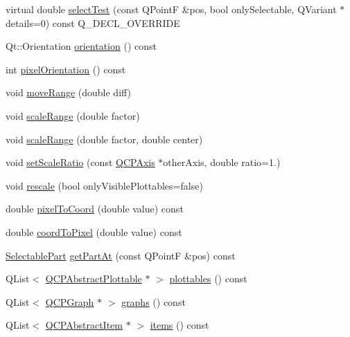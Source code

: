 \begin{DoxyCompactItemize}
\item 
virtual double \hyperlink{classQCPAxis_a63b7103c57fe9acfbce164334ea837f8}{select\+Test} (const Q\+PointF \&pos, bool only\+Selectable, Q\+Variant $\ast$details=0) const Q\+\_\+\+D\+E\+C\+L\+\_\+\+O\+V\+E\+R\+R\+I\+DE
\item 
Qt\+::\+Orientation \hyperlink{classQCPAxis_a57483f2f60145ddc9e63f3af53959265}{orientation} () const 
\item 
int \hyperlink{classQCPAxis_ae3b000e10a6885b8ee05298ae7124ab6}{pixel\+Orientation} () const 
\item 
void \hyperlink{classQCPAxis_a18f3a68f2b691af1fd34b6593c886630}{move\+Range} (double diff)
\item 
void \hyperlink{classQCPAxis_a31d18ddf3a4f21ceb077db8ae5b69856}{scale\+Range} (double factor)
\item 
void \hyperlink{classQCPAxis_a7072ff96fe690148f1bbcdb4f773ea1c}{scale\+Range} (double factor, double center)
\item 
void \hyperlink{classQCPAxis_af4bbd446dcaee5a83ac30ce9bcd6e125}{set\+Scale\+Ratio} (const \hyperlink{classQCPAxis}{Q\+C\+P\+Axis} $\ast$other\+Axis, double ratio=1.)
\item 
void \hyperlink{classQCPAxis_a499345f02ebce4b23d8ccec96e58daa9}{rescale} (bool only\+Visible\+Plottables=false)
\item 
double \hyperlink{classQCPAxis_ae9289ef7043b9d966af88eaa95b037d1}{pixel\+To\+Coord} (double value) const 
\item 
double \hyperlink{classQCPAxis_a985ae693b842fb0422b4390fe36d299a}{coord\+To\+Pixel} (double value) const 
\item 
\hyperlink{classQCPAxis_abee4c7a54c468b1385dfce2c898b115f}{Selectable\+Part} \hyperlink{classQCPAxis_ab2965a8ab1da948b897f1c006080760b}{get\+Part\+At} (const Q\+PointF \&pos) const 
\item 
Q\+List$<$ \hyperlink{classQCPAbstractPlottable}{Q\+C\+P\+Abstract\+Plottable} $\ast$ $>$ \hyperlink{classQCPAxis_a4f7404494cccdbfc00e1e865b7ed16a4}{plottables} () const 
\item 
Q\+List$<$ \hyperlink{classQCPGraph}{Q\+C\+P\+Graph} $\ast$ $>$ \hyperlink{classQCPAxis_ad3919e7d7400f55446ea82018fe5e3a8}{graphs} () const 
\item 
Q\+List$<$ \hyperlink{classQCPAbstractItem}{Q\+C\+P\+Abstract\+Item} $\ast$ $>$ \hyperlink{classQCPAxis_ae437656a5fd1a03721a8f2d7aab460fe}{items} () const 
\end{DoxyCompactItemize}
